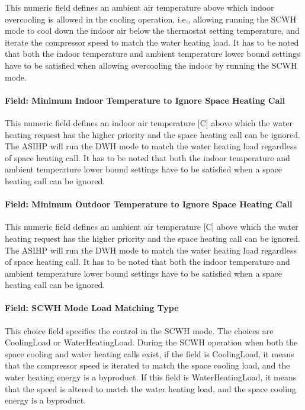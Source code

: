 This numeric field defines an ambient air temperature above which indoor overcooling is allowed in the cooling operation, i.e., allowing running the SCWH mode to cool down the indoor air below the thermostat setting temperature, and iterate the compressor speed to match the water heating load. It has to be noted that both the indoor temperature and ambient temperature lower bound settings have to be satisfied when allowing overcooling the indoor by running the SCWH mode. 

\paragraph{Field: Minimum Indoor Temperature to Ignore Space Heating Call}\label{Field-Minimum-Indoor-IgnoreSH-ASIHP}

This numeric field defines an indoor air temperature [C] above which the water heating request has the higher priority and the space heating call can be ignored. The ASIHP will run the DWH mode to match the water heating load regardless of space heating call. It has to be noted that both the indoor temperature and ambient temperature lower bound settings have to be satisfied when a space heating call can be ignored. 


\paragraph{Field: Minimum Outdoor Temperature to Ignore Space Heating Call}\label{Field-Minimum-Outdoor-IgnoreSH-ASIHP}

This numeric field defines an ambient air temperature [C] above which the water heating request has the higher priority and the space heating call can be ignored. The ASIHP will run the DWH mode to match the water heating load regardless of space heating call. It has to be noted that both the indoor temperature and ambient temperature lower bound settings have to be satisfied when a space heating call can be ignored. 


\paragraph{Field: SCWH Mode Load Matching Type}\label{Field-SCWH-Matching-Type-ASIHP}

This choice field specifies the control in the SCWH mode. The choices are CoolingLoad or WaterHeatingLoad. During the SCWH operation when both the space cooling and water heating calls exist, if the field is CoolingLoad, it means that the compressor speed is iterated to match the space cooling load, and the water heating energy is a byproduct.  If this field is WaterHeatingLoad, it means that the speed is altered to match the water heating load, and the space cooling energy is a byproduct. 



